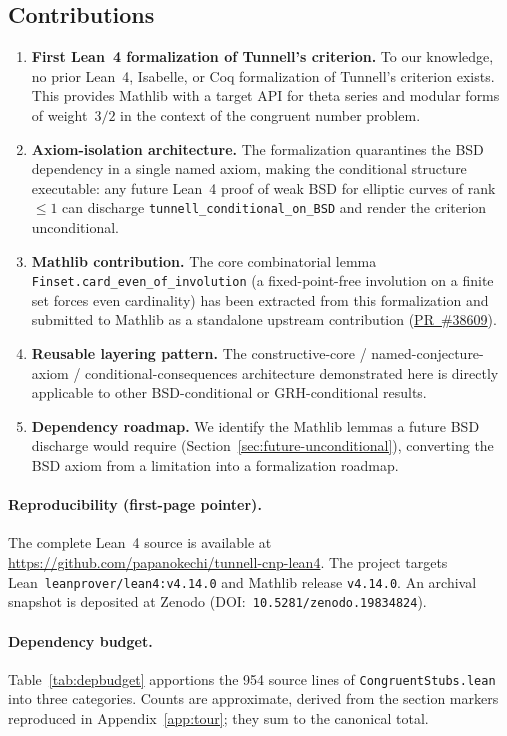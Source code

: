 \documentclass[11pt,a4paper]{article}
\theoremstyle{definition}
\begin{document}
\subsection*{Contributions}
\label{sec:contributions}
\begin{enumerate}
\item \textbf{First Lean~4 formalization of Tunnell's criterion.}
  To our knowledge, no prior Lean~4, Isabelle, or Coq formalization
  of Tunnell's criterion exists.  This provides Mathlib with a
  target API for theta series and modular forms of weight~$3/2$
  in the context of the congruent number problem.
\item \textbf{Axiom-isolation architecture.}  The formalization
  quarantines the BSD dependency in a single named axiom, making
  the conditional structure executable: any future Lean~4 proof of
  weak BSD for elliptic curves of rank~$\leq 1$ can discharge
  \texttt{tunnell\_conditional\_on\_BSD} and render the criterion
  unconditional.
\item \textbf{Mathlib contribution.}
  The core combinatorial lemma
  \texttt{Finset.card\_even\_of\_involution} (a fixed-point-free
  involution on a finite set forces even cardinality) has been
  extracted from this formalization and submitted to Mathlib as a
  standalone upstream contribution
  (\href{https://github.com/leanprover-community/mathlib4/pull/38609}{PR~\#38609}).
\item \textbf{Reusable layering pattern.}  The
  constructive-core / named-conjecture-axiom / conditional-consequences
  architecture demonstrated here is directly applicable to other
  BSD-conditional or GRH-conditional results.
\item \textbf{Dependency roadmap.}  We identify the Mathlib lemmas
  a future BSD discharge would require
  (Section~\ref{sec:future-unconditional}), converting the BSD
  axiom from a limitation into a formalization roadmap.
\end{enumerate}

\paragraph{Reproducibility (first-page pointer).}
The complete Lean~4 source is available at
\url{https://github.com/papanokechi/tunnell-cnp-lean4}.
The project targets Lean~\texttt{leanprover/lean4:v4.14.0}
and Mathlib release \texttt{v4.14.0}.  An archival snapshot is
deposited at Zenodo
(DOI:~\texttt{10.5281/zenodo.19834824}).

\paragraph{Dependency budget.}
Table~\ref{tab:depbudget} apportions the 954 source lines of
\texttt{CongruentStubs.lean} into three categories.  Counts are
approximate, derived from the section markers reproduced in
Appendix~\ref{app:tour}; they sum to the canonical total.
\end{document}
